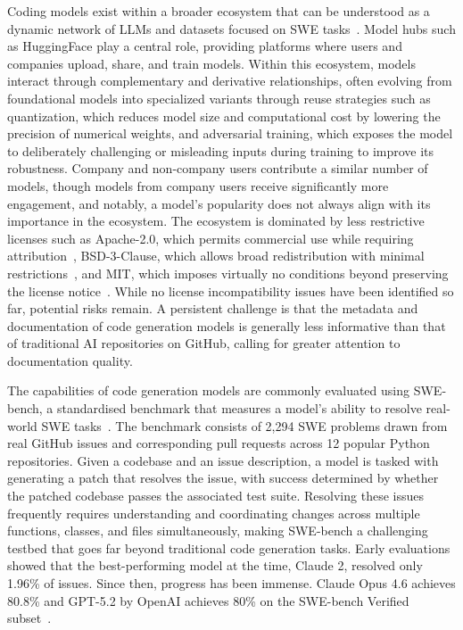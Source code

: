 \documentclass[
english,                 %
bibtex,                  %
includeExtraAbstracts, %
]{kththesis}
\numberwithin{listing}{chapter}
\begin{document}
Coding models exist within a broader ecosystem that can be understood as a dynamic network of \glspl{LLM} and datasets focused on \gls{SWE} tasks~\cite{yang_ecosystem_2026}. Model hubs such as HuggingFace play a central role, providing platforms where users and companies upload, share, and train models. Within this ecosystem, models interact through complementary and derivative relationships, often evolving from foundational models into specialized variants through reuse strategies such as quantization, which reduces model size and computational cost by lowering the precision of numerical weights, and adversarial training, which exposes the model to deliberately challenging or misleading inputs during training to improve its robustness. Company and non-company users contribute a similar number of models, though models from company users receive significantly more engagement, and notably, a model's popularity does not always align with its importance in the ecosystem. The ecosystem is dominated by less restrictive licenses such as Apache-2.0, which permits commercial use while requiring attribution~\cite{the_apache_software_foundation_apache_2026}, \gls{BSD}-3-Clause, which allows broad redistribution with minimal restrictions~\cite{opensourceorg_3-clause_2026}, and \gls{MIT}, which imposes virtually no conditions beyond preserving the license notice~\cite{opensourceorg_mit_2026}. While no license incompatibility issues have been identified so far, potential risks remain. A persistent challenge is that the metadata and documentation of code generation models is generally less informative than that of traditional \gls{AI} repositories on GitHub, calling for greater attention to documentation quality.

The capabilities of code generation models are commonly evaluated using \gls{SWE}-bench, a standardised benchmark that measures a model's ability to resolve real-world \gls{SWE} tasks~\cite{jimenez_swe-bench_2024}. The benchmark consists of 2,294 \gls{SWE} problems drawn from real GitHub issues and corresponding pull requests across 12 popular Python repositories. Given a codebase and an issue description, a model is tasked with generating a patch that resolves the issue, with success determined by whether the patched codebase passes the associated test suite. Resolving these issues frequently requires understanding and coordinating changes across multiple functions, classes, and files simultaneously, making \gls{SWE}-bench a challenging testbed that goes far beyond traditional code generation tasks. Early evaluations showed that the best-performing model at the time, Claude 2, resolved only 1.96\% of issues. Since then, progress has been immense. Claude Opus 4.6 achieves 80.8\% and \gls{GPT}-5.2 by Open\Gls{AI} achieves 80\% on the \gls{SWE}-bench Verified subset~\cite{anthropic_pbc_system_2026}.
\end{document}
